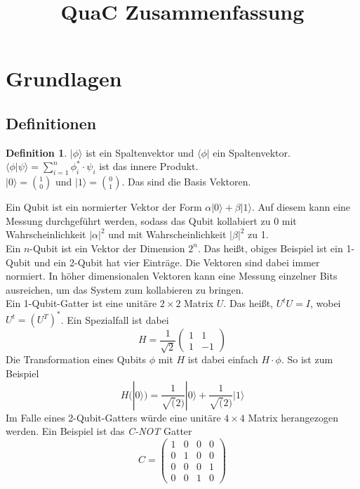 \documentclass[a4paper, 12pt]{article}
\theoremstyle{plain}
\theoremstyle{definition}
\newtheorem{definition}[theorem]{Definition} %
\theoremstyle{lemma}
\theoremstyle{remark}
\theoremstyle{example}
\begin{document}
	\begin{titlepage} 
		\title{QuaC Zusammenfassung}
		\clearpage\maketitle
		\thispagestyle{empty}
	\end{titlepage}
	\tableofcontents
	\newpage
	\section{Grundlagen}
	\subsection{Definitionen}
	\begin{definition}
		$|\phi \rangle$ ist ein Spaltenvektor und $\langle \phi |$ ein Spaltenvektor.\\
		$\langle \phi | \psi \rangle = \sum_{i=1}^{n} \phi_i^* \cdot \psi_i$ ist das innere Produkt.\\
		$|0 \rangle = \binom{1}{0}$ und $|1 \rangle = \binom{0}{1}$. Das sind die Basis Vektoren.
	\end{definition}
	Ein Qubit ist ein normierter Vektor der Form $\alpha |0\rangle + \beta |1\rangle$. Auf diesem kann eine Messung durchgeführt werden, sodass das Qubit kollabiert zu 0 mit Wahrscheinlichkeit $\left|\alpha\right|^2$ und mit Wahrscheinlichkeit  $\left|\beta\right|^2$ zu 1.\\
	Ein $n$-Qubit ist ein Vektor der Dimension $2^n$. Das heißt, obiges Beispiel ist ein 1-Qubit und ein 2-Qubit hat vier Einträge. Die Vektoren sind dabei immer normiert. In höher dimensionalen Vektoren kann eine Messung einzelner Bits ausreichen, um das System zum kollabieren zu bringen.\\
	Ein 1-Qubit-Gatter ist eine unitäre $2\times 2$ Matrix $U$. Das heißt, $U^tU = I$, wobei $U^t = (U^T)^*$. Ein Spezialfall ist dabei $$H = \frac{1}{\sqrt{2}}\begin{pmatrix}
		1 & 1\\
		1 & -1
	\end{pmatrix}$$
	Die Transformation eines Qubits $\phi$ mit $H$ ist dabei einfach $H\cdot \phi$. So ist zum Beispiel $$H(|0\rangle) = \frac{1}{\sqrt(2)} |0\rangle + \frac{1}{\sqrt(2)}|1\rangle$$ Im Falle eines 2-Qubit-Gatters würde eine unitäre $4\times 4$ Matrix herangezogen werden. Ein Beispiel ist das \textit{C-NOT} Gatter \[C = \begin{pmatrix}
		1 & 0 & 0 & 0\\
		0 & 1 & 0 & 0\\
		0 & 0 & 0 & 1\\
		0 & 0 & 1 & 0
	\end{pmatrix}\]
	
\end{document}
